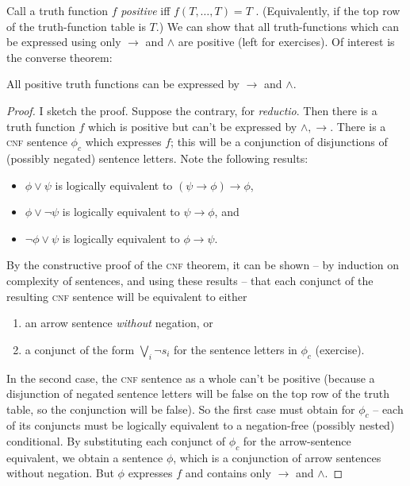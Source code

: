 Call a truth function $f$ \emph{positive}  iff $f(T,\ldots,T)=T$ \citep[exercise 2.9.3]{bosintlo}. (Equivalently, if the top row of the truth-function table is $T$.) We can show that  all truth-functions which can be expressed using only $\to$ and $\wedge$ are positive (left for exercises). Of interest is the converse theorem: \begin{theorem}
	All positive truth functions can be expressed by $\to$ and $\wedge$. \label{positive} \begin{proof}
	I sketch the proof.	Suppose the contrary, for \emph{reductio}. Then there is a truth function $f$ which is positive but can't be expressed by $\wedge,\to$. There is a \textsc{\lowercase{CNF}} sentence $\phi_{c}$ which expresses $f$; this will be a conjunction of disjunctions of (possibly negated) sentence letters. Note the following results: \begin{itemize}
		\item  $\phi\vee \psi$ is logically equivalent to $(\psi \to \phi)\to \phi$, 
		\item $\phi \vee \neg \psi$ is logically equivalent to $\psi \to \phi$, and 
		\item  $\neg\phi\vee\psi$ is logically equivalent to $\phi\to \psi$.
	\end{itemize} By the constructive proof of the \textsc{\lowercase{CNF}} theorem, it can be shown – by induction on complexity of sentences, and using these results – that each conjunct of the resulting \textsc{\lowercase{CNF}} sentence will be equivalent to either \begin{enumerate}
		\item an arrow sentence \emph{without} negation, or 
		\item a conjunct  of the form $\bigvee_{i} \neg s_{i}$ for the sentence letters in $\phi_{c}$ (exercise).
	\end{enumerate}  In the second case, the \textsc{\lowercase{CNF}} sentence as a whole can't be positive (because a disjunction of negated sentence letters will be false on the top row of the truth table, so the conjunction will be false). So the first case must obtain for $\phi_{c}$ – each of its conjuncts must be logically equivalent to a negation-free (possibly nested) conditional. By substituting each conjunct of $\phi_{c}$ for the arrow-sentence equivalent, we obtain a sentence $\phi$, which is a conjunction of arrow sentences without negation. But $\phi$ expresses $f$ and contains only $\to$ and $\wedge$.
	\end{proof}
\end{theorem} 




